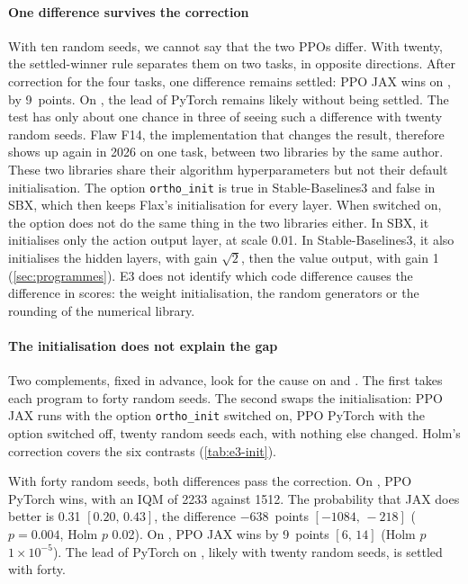 \paragraph{One difference survives the correction}
With ten random seeds, we cannot say that the two PPOs differ. With twenty, the settled-winner rule
separates them on two tasks, in opposite directions. After correction for the four tasks, one difference
remains settled: PPO JAX wins on , by 9~points. On , the lead of PyTorch remains
likely without being settled. The test has only about one chance in three of seeing such a difference with
twenty random seeds. Flaw F14, the implementation that changes the result, therefore shows up again in 2026 on
one task, between two libraries by the same author. These two libraries share their algorithm hyperparameters but
not their default initialisation. The option \texttt{ortho\_init} is true in Stable-Baselines3 and false in
SBX, which then keeps Flax's initialisation for every layer. When switched on, the option does not do the same
thing in the two libraries either. In SBX, it initialises only the action output layer, at scale 0.01. In Stable-Baselines3, it also initialises the hidden layers, with gain $\sqrt2$, then the
value output, with gain 1 (\cref{sec:programmes}). E3 does not identify
which code difference causes the difference in scores: the weight initialisation, the random generators or the rounding of the
numerical library.

\paragraph{The initialisation does not explain the gap}\label{sec:e3-init}
Two complements, fixed in advance, look for the cause on  and . The first takes
each program to forty random seeds. The second swaps the initialisation: PPO JAX runs with the option
\texttt{ortho\_init} switched on, PPO PyTorch with the option switched off, twenty random seeds each, with
nothing else changed. Holm's correction covers the six contrasts (\cref{tab:e3-init}).


With forty random seeds, both differences pass the correction. On , PPO PyTorch wins, with an
IQM of \num{2233} against \num{1512}. The probability that JAX does better is 0.31 $[0.20,\,0.43]$, the
difference $-638$~points $[-\num{1084},\,-218]$ ($p = 0.004$, Holm $p$ 0.02). On , PPO JAX wins
by 9~points $[6,\,14]$ (Holm $p$ $1 \times 10^{-5}$). The lead of PyTorch on , likely with twenty
random seeds, is settled with forty.

